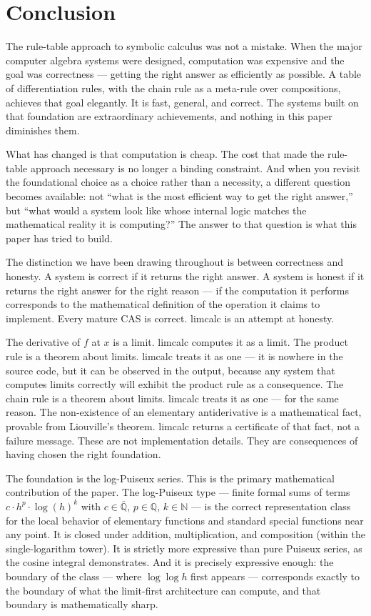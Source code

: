 \documentclass[12pt]{article}
\begin{document}
\section{Conclusion}\label{conclusion}

The rule-table approach to symbolic calculus was not a mistake. When the
major computer algebra systems were designed, computation was expensive
and the goal was correctness --- getting the right answer as efficiently
as possible. A table of differentiation rules, with the chain rule as a
meta-rule over compositions, achieves that goal elegantly. It is fast,
general, and correct. The systems built on that foundation are
extraordinary achievements, and nothing in this paper diminishes them.

What has changed is that computation is cheap. The cost that made the
rule-table approach necessary is no longer a binding constraint. And
when you revisit the foundational choice as a choice rather than a
necessity, a different question becomes available: not ``what is the
most efficient way to get the right answer,'' but ``what would a system
look like whose internal logic matches the mathematical reality it is
computing?'' The answer to that question is what this paper has tried to
build.

The distinction we have been drawing throughout is between correctness
and honesty. A system is correct if it returns the right answer. A
system is honest if it returns the right answer for the right reason ---
if the computation it performs corresponds to the mathematical
definition of the operation it claims to implement. Every mature CAS is
correct. limcalc is an attempt at honesty.

The derivative of \(f\) at \(x\) is a limit. limcalc computes it as a
limit. The product rule is a theorem about limits. limcalc treats it as
one --- it is nowhere in the source code, but it can be observed in the
output, because any system that computes limits correctly will exhibit
the product rule as a consequence. The chain rule is a theorem about
limits. limcalc treats it as one --- for the same reason. The
non-existence of an elementary antiderivative is a mathematical fact,
provable from Liouville's theorem. limcalc returns a certificate of that
fact, not a failure message. These are not implementation details. They
are consequences of having chosen the right foundation.

The foundation is the log-Puiseux series. This is the primary
mathematical contribution of the paper. The log-Puiseux type --- finite
formal sums of terms \(c \cdot h^p \cdot \log(h)^k\) with
\(c \in \bar{\mathbb{Q}}\), \(p \in \mathbb{Q}\), \(k \in \mathbb{N}\)
--- is the correct representation class for the local behavior of
elementary functions and standard special functions near any point. It
is closed under addition, multiplication, and composition (within the
single-logarithm tower). It is strictly more expressive than pure
Puiseux series, as the cosine integral demonstrates. And it is precisely
expressive enough: the boundary of the class --- where \(\log \log h\)
first appears --- corresponds exactly to the boundary of what the
limit-first architecture can compute, and that boundary is
mathematically sharp.
\end{document}
